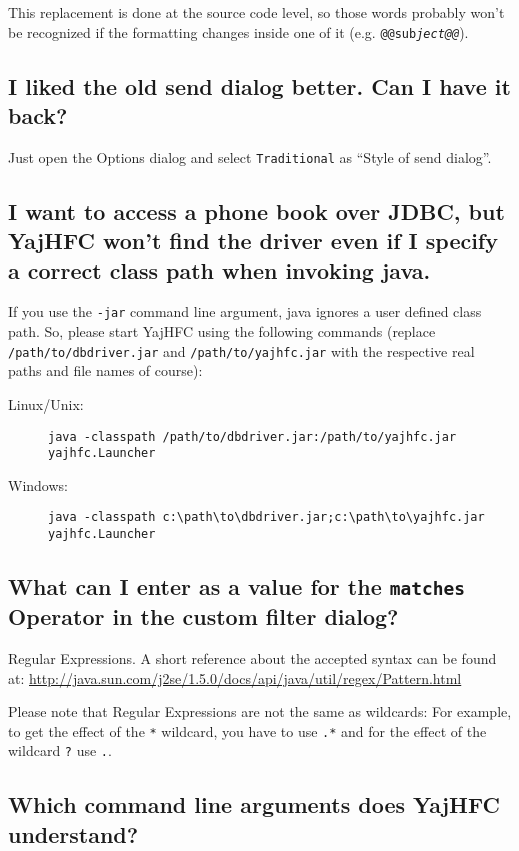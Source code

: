\documentclass[a4paper,10pt]{scrartcl}
\begin{document}
This replacement is done at the source code level, so those words probably won't be recognized if the formatting changes inside one of it (e.g. \texttt{@@sub\textit{ject@@}}).

\subsection{I liked the old send dialog better. Can I have it back?}

Just open the Options dialog and select \texttt{Traditional} as ``Style of send dialog''.

\subsection{I want to access a phone book over JDBC, but YajHFC won't find the driver even if I specify a correct class path when invoking java.}

If you use the \texttt{-jar} command line argument, java ignores a user defined class path.
So, please start YajHFC using the following commands (replace \texttt{/path/to/dbdriver.jar} and \texttt{/path/to/yajhfc.jar} with the respective real paths and file names of course):
\begin{description}
\item [Linux/Unix:] \verb#java -classpath /path/to/dbdriver.jar:/path/to/yajhfc.jar yajhfc.Launcher#
\item [Windows:] \verb#java -classpath c:\path\to\dbdriver.jar;c:\path\to\yajhfc.jar yajhfc.Launcher#
\end{description}

\subsection{What can I enter as a value for the \texttt{matches} Operator in the custom filter dialog?}

Regular Expressions. A short reference about the accepted syntax can be found at:
\url{http://java.sun.com/j2se/1.5.0/docs/api/java/util/regex/Pattern.html}

Please note that Regular Expressions are not the same as wildcards: 
For example, to get the effect of the \verb.*. wildcard, you have to use \verb#.*# and 
for the effect of the wildcard \verb#?# use \verb#.#.

\subsection{Which command line arguments does YajHFC understand?}
\end{document}
